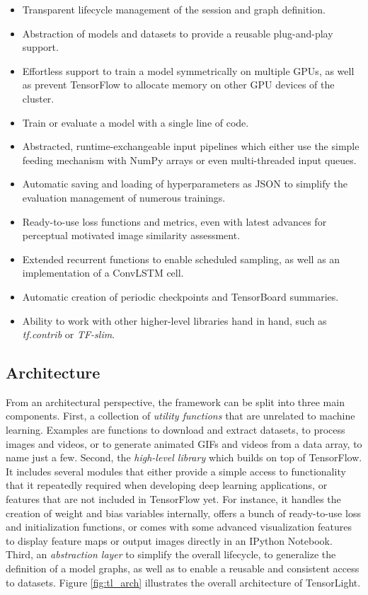 \begin{itemize}
\item Transparent lifecycle management of the session and graph definition.
\item Abstraction of models and datasets to provide a reusable plug-and-play support.
\item Effortless support to train a model symmetrically on multiple GPUs, as well as prevent TensorFlow to allocate memory on other GPU devices of the cluster.
\item Train or evaluate a model with a single line of code.
\item Abstracted, runtime-exchangeable input pipelines which either use the simple feeding mechanism with NumPy arrays or even multi-threaded input queues.
\item Automatic saving and loading of hyperparameters as JSON to simplify the evaluation management of numerous trainings.
\item Ready-to-use loss functions and metrics, even with latest advances for perceptual motivated image similarity assessment.
\item Extended recurrent functions to enable scheduled sampling, as well as an implementation of a ConvLSTM cell.
\item Automatic creation of periodic checkpoints and TensorBoard summaries.
\item Ability to work with other higher-level libraries hand in hand, such as \textit{tf.contrib} or \textit{TF-slim}.
\end{itemize}


\subsection{Architecture}

From an architectural perspective, the framework can be split into three main components. First, a collection of \textit{utility functions} that are unrelated to machine learning. Examples are functions to download and extract datasets, to process images and videos, or to generate animated GIFs and videos from a data array, to name just a few. Second, the \textit{high-level library} which builds on top of TensorFlow. It includes several modules that either provide a simple access to functionality that it repeatedly required when developing deep learning applications, or features that are not included in TensorFlow yet. For instance, it handles the creation of weight and bias variables internally, offers a bunch of ready-to-use loss and initialization functions, or comes with some advanced visualization features to display feature maps or output images directly in an IPython Notebook. Third, an \textit{abstraction layer} to simplify the overall lifecycle, to generalize the definition of a model graphs, as well as to enable a reusable and consistent access to datasets. Figure \ref{fig:tl_arch} illustrates the overall architecture of TensorLight.

